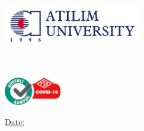\makeatletter
\begin{coverpages}
    \BgThispage
    \begin{minipage}{0.48\textwidth}
        \begin{flushleft}
            \includegraphics[width=6cm]{images/atilim-logo.jpg}
        \end{flushleft}
    \end{minipage}
    \begin{minipage}{0.48\textwidth}

        \vspace{2mm}


        \vspace{2mm}

    \end{minipage}

    \vspace*{2cm}

    \begin{minipage}{0.7\textwidth}
        \textcolor{white}{
            \Huge\@cover\\[6mm]
            \LARGE\@examname
        }
    \end{minipage}
    \begin{minipage}{0.2\textwidth}
        \begin{flushright}
            \includegraphics[width=2.5cm]{images/guvenli-kampus.png}
        \end{flushright}
    \end{minipage}

    \vspace*{2cm}

    \begin{doublespace}
        \noindent{}

        \noindent\uline{Date: \@date \hfill}


\end{doublespace}
\end{coverpages}
